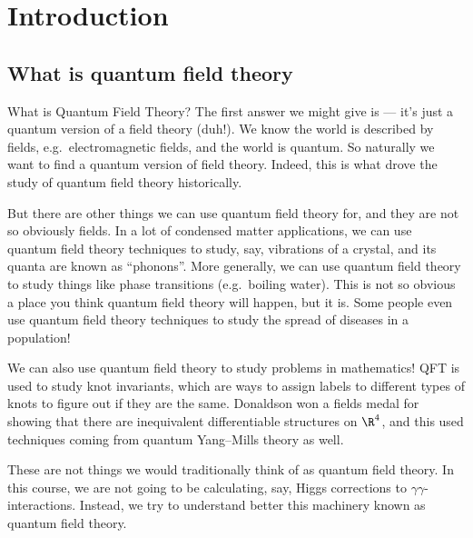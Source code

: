 \documentclass[a4paper]{article}
\begin{document}
\tableofcontents

\setcounter{section}{-1}
\section{Introduction}
\subsection{What is quantum field theory}
What is Quantum Field Theory? The first answer we might give is --- it's just a quantum version of a field theory (duh!). We know the world is described by fields, e.g.\ electromagnetic fields, and the world is quantum. So naturally we want to find a quantum version of field theory. Indeed, this is what drove the study of quantum field theory historically.

But there are other things we can use quantum field theory for, and they are not so obviously fields. In a lot of condensed matter applications, we can use quantum field theory techniques to study, say, vibrations of a crystal, and its quanta are known as ``phonons''. More generally, we can use quantum field theory to study things like phase transitions (e.g.\ boiling water). This is not so obvious a place you think quantum field theory will happen, but it is. Some people even use quantum field theory techniques to study the spread of diseases in a population!

We can also use quantum field theory to study problems in mathematics! QFT is used to study knot invariants, which are ways to assign labels to different types of knots to figure out if they are the same. Donaldson won a fields medal for showing that there are inequivalent differentiable structures on $\R^4$, and this used techniques coming from quantum Yang--Mills theory as well.

These are not things we would traditionally think of as quantum field theory. In this course, we are not going to be calculating, say, Higgs corrections to $\gamma\gamma$-interactions. Instead, we try to understand better this machinery known as quantum field theory.
\end{document}
